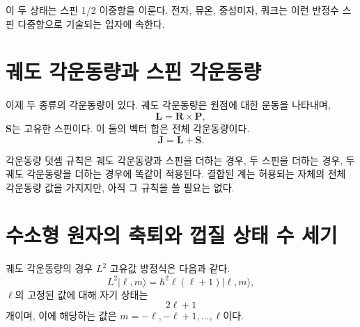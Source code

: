 이 두 상태는 스핀 1/2 이중항을 이룬다. 전자, 뮤온, 중성미자, 쿼크는 이런 반정수 스핀 다중항으로 기술되는 입자에 속한다.

\section{궤도 각운동량과 스핀 각운동량}

이제 두 종류의 각운동량이 있다. 궤도 각운동량은 원점에 대한 운동을 나타내며,
\begin{equation}
\mathbf L=\mathbf R\times\mathbf P,
\end{equation}
\(\mathbf S\)는 고유한 스핀이다. 이 둘의 벡터 합은 전체 각운동량이다.
\begin{equation}
\mathbf J=\mathbf L+\mathbf S.
\end{equation}

\begin{classroomqa}
\end{classroomqa}

각운동량 덧셈 규칙은 궤도 각운동량과 스핀을 더하는 경우, 두 스핀을 더하는 경우, 두 궤도 각운동량을 더하는 경우에 똑같이 적용된다. 결합된 계는 허용되는 자체의 전체 각운동량 값을 가지지만, 아직 그 규칙을 쓸 필요는 없다.

\begin{classroomqa}
\end{classroomqa}

\section{수소형 원자의 축퇴와 껍질 상태 수 세기}

궤도 각운동량의 경우 \(L^{2}\) 고유값 방정식은 다음과 같다.
\begin{equation}
L^{2}\lvert\ell,m\rangle
=\hbar^{2}\ell(\ell+1)\lvert\ell,m\rangle,
\end{equation}
\(\ell\)의 고정된 값에 대해 자기 상태는
\begin{equation}
2\ell+1
\end{equation}
개이며, 이에 해당하는 값은 \(m=-\ell,-\ell+1,\ldots,\ell\)이다.

